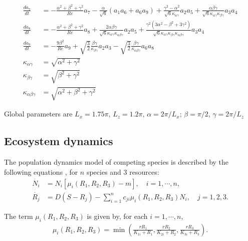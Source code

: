 \documentclass[9pt,twoside,lineno]{pnas-new}
\begin{document}
\begin{align*}
\frac{da_7}{dt} &= -\frac{\alpha^2 + \beta^2 + \gamma^2}{Re} a_7 - \frac{\alpha}{\sqrt{6}}(a_1 a_6 + a_6 a_9) + \frac{\gamma^2 - \alpha^2}{\sqrt{6}\kappa_{\alpha\gamma}}a_2 a_5 + \frac{\alpha\beta\gamma}{\sqrt{6}\kappa_{\alpha\gamma}\kappa_{\beta\gamma}}a_3 a_4\\
\frac{da_8}{dt} &= -\frac{\alpha^2 + \beta^2 + \gamma^2}{Re} a_8 + \frac{2\alpha\beta\gamma}{\sqrt{6}\kappa_{\alpha\gamma}\kappa_{\alpha\beta\gamma}} a_2 a_5  + \frac{\gamma^2(3\alpha^2 - \beta^2 + 3\gamma^2)}{\sqrt{6} \kappa_{\alpha\gamma}\kappa_{\beta\gamma}\kappa_{\alpha\beta\gamma}}a_3 a_4\\
\frac{da_9}{dt} &= -\frac{9\beta^2}{Re} a_9 + \sqrt{\frac{3}{2}}\frac{\beta \gamma}{\kappa_{\beta\gamma}}a_2 a_3 - \sqrt{\frac{3}{2}}\frac{\beta\gamma}{\kappa_{\alpha\beta\gamma}}a_6 a_8\\
\kappa_{\alpha\gamma} &= \sqrt{\alpha^2 + \gamma^2}\\
\kappa_{\beta\gamma} &= \sqrt{\beta^2 + \gamma^2}\\
\kappa_{\alpha\beta\gamma} &= \sqrt{\alpha^2+ \beta^2 + \gamma^2}
\end{align*}

Global parameters are    $L_x = 1.75\pi$, $L_z = 1.2\pi$, $\alpha = 2\pi/L_x$; $\beta = \pi/2$,  $\gamma = 2\pi/L_z$ 



\subsection*{Ecosystem dynamics}
The population dynamics model of competing species is described by the following equations \cite{huisman2001fundamental}, for $n$ species and $3$ resources:
\begin{align*}
    \dot{N_i} &= N_i [\mu_i(R_1, R_2, R_3) - m ], \quad i = 1, \cdots, n, \\
    \dot{R_j} &= D (S - R_j) - \sum_{i=1}^n c_{ji} \mu_i(R_1, R_2, R_3) N_i, \quad j = 1, 2, 3.
\end{align*}

The term $\mu_i(R_1, R_2, R_3)$ is given by, for each $i = 1, \cdots, n$,
\begin{align*}
    \mu_i(R_1, R_2, R_3) = \min\left( \frac{r R_1}{K_{1i} + R_1}, \frac{r R_2}{K_{2i} + R_2}, \frac{r R_3}{K_{3i} + R_3} \right).
\end{align*}
\end{document}
